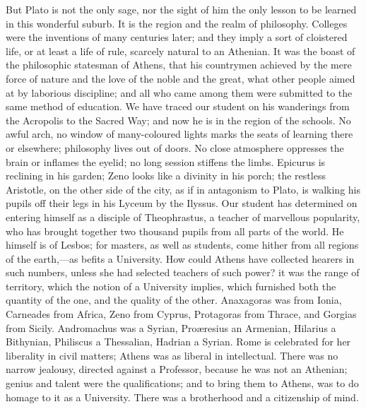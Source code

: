 But Plato is not the only sage, nor the sight of him the only
lesson to be learned in this wonderful suburb. It is the region and
the realm of philosophy. Colleges were the inventions of many
centuries later; and they imply a sort of cloistered life, or at least
a life of rule, scarcely natural to an Athenian. It was the boast of
the philosophic statesman of Athens, that his countrymen achieved by
the mere force of nature and the love of the noble and the great, what
other people aimed at by laborious discipline; and all who came among
them were submitted to the same method of education. We have traced
our student on his wanderings from the Acropolis to the Sacred Way;
and now he is in the region of the schools. No awful arch, no window
of many-coloured lights marks the seats of learning there or
elsewhere; philosophy lives out of doors. No close atmosphere
oppresses the brain or inflames the eyelid; no long session stiffens
the limbs. Epicurus is reclining in his garden; Zeno looks like a
divinity in his porch; the restless Aristotle, on the other side of
the city, as if in antagonism to Plato, is walking his pupils off
their legs in his Lyceum by the Ilyssus. Our student has determined on
entering himself as a disciple of Theophrastus, a teacher of
marvellous popularity, who has brought together two thousand pupils
from all parts of the world. He himself is of Lesbos; for masters, as
well as students, come hither from all regions of the earth,—as
befits a University. How could Athens have collected hearers in such
numbers, unless she had selected teachers of such power? it was the
range of territory, which the notion of a University implies, which
furnished both the quantity of the one, and the quality of the other.
Anaxagoras was from Ionia, Carneades from Africa, Zeno from Cyprus,
Protagoras from Thrace, and Gorgias from Sicily. Andromachus was a
Syrian, Proæresius an Armenian, Hilarius a Bithynian, Philiscus a
Thessalian, Hadrian a Syrian. Rome is celebrated for her liberality in
civil matters; Athens was as liberal in intellectual. There was no
narrow jealousy, directed against a Professor, because he was not an
Athenian; genius and talent were the qualifications; and to bring them
to Athens, was to do homage to it as a University. There was a
brotherhood and a citizenship of mind.

